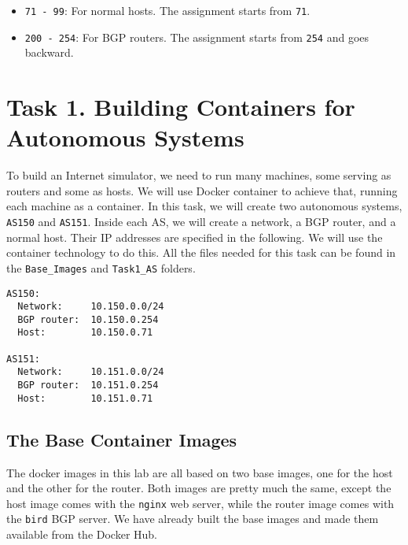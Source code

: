 \begin{itemize}[noitemsep]
\item \texttt{71 - 99}: For normal hosts.
      The assignment starts from \texttt{71}.  

\item \texttt{200 - 254}: For BGP routers. 
   The assignment starts from \texttt{254} and goes backward. 
\end{itemize}






\section{Task 1. Building Containers for Autonomous Systems}

To build an Internet simulator, we need to run many machines,
some serving as routers and some as hosts. 
We will use Docker container to achieve that, running each
machine as a container. 
In this task, we will create two autonomous systems, \texttt{AS150} and \texttt{AS151}.  Inside
each AS, we will create a network, a BGP router, and a normal host. Their IP addresses are
specified in the following. We will use the container technology to
do this. All the files needed 
for this task can be found in the \texttt{Base\_Images} and \texttt{Task1\_AS} folders.

\begin{lstlisting}
AS150: 
  Network:     10.150.0.0/24
  BGP router:  10.150.0.254
  Host:        10.150.0.71

AS151:
  Network:     10.151.0.0/24
  BGP router:  10.151.0.254
  Host:        10.151.0.71
\end{lstlisting}


\subsection{The Base Container Images} 

The docker images in this lab are all based on two
base images, one for the host and the other 
for the router. Both images are pretty much the same,
except the host image comes with the \texttt{nginx}  
web server, while the router image comes with 
the \texttt{bird} BGP server. We have already built 
the base images and made them available 
from the Docker Hub. 

